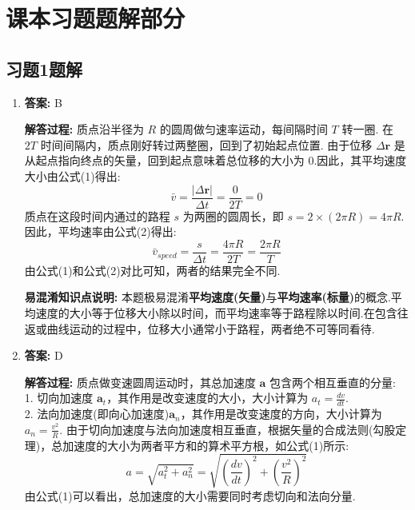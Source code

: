 \section{课本习题题解部分}
\subsection{习题1题解}

\begin{enumerate}

\item[\textbf{1-4}]

\textbf{答案:} B

\textbf{解答过程:}
质点沿半径为 $R$ 的圆周做匀速率运动，每间隔时间 $T$ 转一圈.
在 $2T$ 时间间隔内，质点刚好转过两整圈，回到了初始起点位置.
由于位移 $\Delta \mathbf{r}$ 是从起点指向终点的矢量，回到起点意味着总位移的大小为 $0$.因此，其平均速度大小由公式(1)得出:
\begin{equation}
	\bar{v} = \frac{|\Delta \mathbf{r}|}{\Delta t} = \frac{0}{2T} = 0
\end{equation}
质点在这段时间内通过的路程 $s$ 为两圈的圆周长，即 $s = 2 \times (2\pi R) = 4\pi R$.因此，平均速率由公式(2)得出:
\begin{equation}
	\bar{v}_{speed} = \frac{s}{\Delta t} = \frac{4\pi R}{2T} = \frac{2\pi R}{T}
\end{equation}
由公式(1)和公式(2)对比可知，两者的结果完全不同.

\textbf{易混淆知识点说明:}
本题极易混淆\textbf{平均速度(矢量)}与\textbf{平均速率(标量)}的概念.平均速度的大小等于位移大小除以时间，而平均速率等于路程除以时间.在包含往返或曲线运动的过程中，位移大小通常小于路程，两者绝不可等同看待.

\vspace{2em}

\item[\textbf{1-5}]


\textbf{答案:} D

\textbf{解答过程:}
质点做变速圆周运动时，其总加速度 $\mathbf{a}$ 包含两个相互垂直的分量:\\
1. 切向加速度 $\mathbf{a}_t$，其作用是改变速度的大小，大小计算为 $a_t = \frac{dv}{dt}$.\\
2. 法向加速度(即向心加速度)$\mathbf{a}_n$，其作用是改变速度的方向，大小计算为 $a_n = \frac{v^2}{R}$.
由于切向加速度与法向加速度相互垂直，根据矢量的合成法则(勾股定理)，总加速度的大小为两者平方和的算术平方根，如公式(1)所示:
\begin{equation}
	a = \sqrt{a_t^2 + a_n^2} = \sqrt{\left(\frac{dv}{dt}\right)^2 + \left(\frac{v^2}{R}\right)^2}
\end{equation}
由公式(1)可以看出，总加速度的大小需要同时考虑切向和法向分量.


\end{enumerate}
